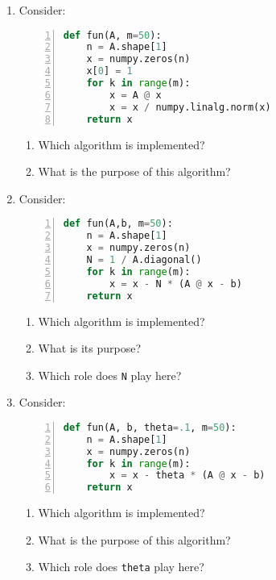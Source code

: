 \vspace*{-0.5cm}
\begin{enumerate}
\item Consider:
\begin{lstlisting}[language=python,numbers=left]
def fun(A, m=50):
    n = A.shape[1]
    x = numpy.zeros(n)
    x[0] = 1	
    for k in range(m):
        x = A @ x
        x = x / numpy.linalg.norm(x)
    return x
\end{lstlisting}
\begin{enumerate}
	\item Which algorithm is implemented? 
	\item What is the purpose of this algorithm?
\end{enumerate}
	\item Consider:
\begin{lstlisting}[language=python,numbers=left]
def fun(A,b, m=50):
    n = A.shape[1]
    x = numpy.zeros(n)
    N = 1 / A.diagonal()		
    for k in range(m):
        x = x - N * (A @ x - b)
    return x
\end{lstlisting}
	\begin{enumerate}
		\item Which algorithm is implemented?
		\item What is its purpose? 
		\item Which role does \verb|N| play here?
	\end{enumerate}

\item Consider:
\begin{lstlisting}[language=python,numbers=left]
def fun(A, b, theta=.1, m=50):
    n = A.shape[1]
    x = numpy.zeros(n)		
    for k in range(m):
        x = x - theta * (A @ x - b)
    return x
\end{lstlisting}
\begin{enumerate}
	\item Which algorithm is implemented? 
	\item What is the purpose of this algorithm?
	\item Which role does \verb|theta| play here?
\end{enumerate}
\end{enumerate}
 